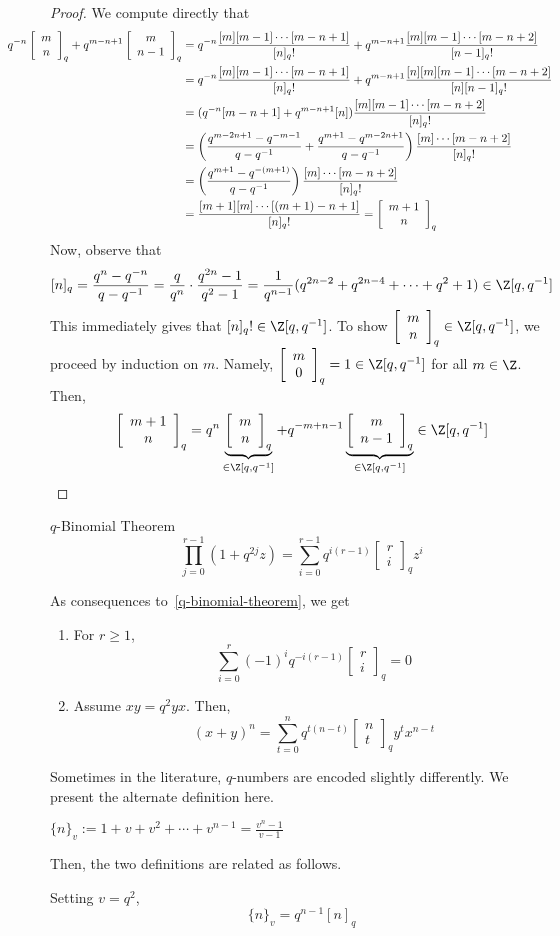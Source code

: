 \documentclass[11pt,leqno,oneside]{amsbook}
\numberwithin{thm}{section}
\newcommand{\qfactorial}[1]{[#1]_q!}
\newcommand{\qbinom}[3][q]{\left[\begin{array}{c}#2\\#3\end{array}\right]_{#1}}
\begin{document}
\begin{proof}
  We compute directly that
  \begin{align*}
     \hspace{-0.5in} q^{-n}\qbinom{m}{n}+q^{m-n+1}\qbinom{m}{n-1}
    & =
    q^{-n}\frac{[m][m-1]\cdots[m-n+1]}{\qfactorial{n}} +
      q^{m-n+1}\frac{[m][m-1]\cdots [m-n+2]}{\qfactorial{n-1}}
      \\
    & =
    q^{-n}\frac{[m][m-1]\cdots[m-n+1]}{\qfactorial{n}} +
    q^{m-n+1}\frac{[n][m][m-1]\cdots [m-n+2]}{[n]\qfactorial{n-1}}\\
    & = (q^{-n}[m-n+1] +
    q^{m-n+1}[n])\frac{[m][m-1]\cdots[m-n+2]}{\qfactorial{n}}\\
    & =
      \left(\frac{q^{m-2n+1}-q^{-m-1}}{q-q^{-1}}+\frac{q^{m+1}-q^{m-2n+1}}{q-q^{-1}}\right)\frac{[m]\cdots[m-n+2]}{\qfactorial{n}}
    \\
    & =
      \left(\frac{q^{m+1}-q^{-(m+1)}}{q-q^{-1}}\right)\frac{[m]\cdots[m-n+2]}{\qfactorial{n}}
    \\
    & = \frac{[m+1][m] \cdots [(m+1)-n+1]}{\qfactorial{n}} = \qbinom{m+1}{n}
  \end{align*}
  Now, observe that \[
    [n]_q = \frac{q^n-q^{-n}}{q-q^{-1}} = \frac{q}{q^n}\cdot
    \frac{q^{2n}-1}{q^2-1} =
    \frac{1}{q^{n-1}}(q^{2n-2}+q^{2n-4}+\cdots+q^2+1) \in \Z[q,q^{-1}]
  \]
  This immediately gives that \(\qfactorial{n} \in \Z[q,q^{-1}]\). To
  show \(\qbinom{m}{n} \in \Z[q,q^{-1}]\), we proceed by
  induction on \(m\). Namely, \(\qbinom{m}{0} = 1 \in \Z[q,q^{-1}]\) for all
  \(m \in \Z\). Then, \[
    \qbinom{m+1}{n} = q^{n}\underbrace{\qbinom{m}{n}}_{\in
      \Z[q,q^{-1}]} + q^{-m+n-1}\underbrace{\qbinom{m}{n-1}}_{\in
      \Z[q,q^{-1}]} \in \Z[q,q^{-1}]
  \]
\end{proof}
\begin{thm}{\(q\)-Binomial Theorem}\label{q-binomial-theorem}
  \[
    \prod_{j=0}^{r-1} (1+q^{2j}z) = \sum_{i=0}^{r-1} q^{i(r-1)}
    \qbinom{r}{i} z^i
  \]
\end{thm}
\begin{cor}
  As consequences to~\ref{q-binomial-theorem}, we get
  \begin{enumerate}
  \item For \(r \geq 1\),
    \[
      \sum_{i=0}^r (-1)^i q^{-i(r-1)} \qbinom{r}{i} = 0
    \]
  \item Assume \(xy = q^2yx\). Then, \[
      (x+y)^n = \sum_{t=0}^n q^{t(n-t)}\qbinom{n}{t}y^t x^{n-t}
    \]
  \end{enumerate}
\end{cor}
Sometimes in the literature, \(q\)-numbers are encoded slightly
differently. We present the alternate definition here.
\begin{defn}
  \(\{n\}_v := 1+v+v^2 + \cdots + v^{n-1} = \frac{v^n-1}{v-1}\)
\end{defn}
Then, the two definitions are related as follows.
\begin{prop}
  Setting \(v=q^2\), \[
    \{n\}_v = q^{n-1}[n]_q
  \]
\end{prop}
\end{document}
